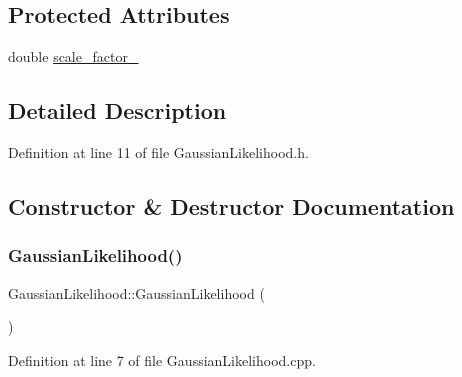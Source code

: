 \subsection*{Protected Attributes}
\begin{DoxyCompactItemize}
\item 
double \mbox{\hyperlink{classbfl_1_1GaussianLikelihood_ad08436040da927c3a2bdeac9eab8aedf}{scale\+\_\+factor\+\_\+}}
\end{DoxyCompactItemize}


\subsection{Detailed Description}


Definition at line 11 of file Gaussian\+Likelihood.\+h.



\subsection{Constructor \& Destructor Documentation}
\mbox{\label{classbfl_1_1GaussianLikelihood_a431a2163fac8be200939266f28b62e6f}} 
\subsubsection{\texorpdfstring{Gaussian\+Likelihood()}{GaussianLikelihood()}\hspace{0.1cm}{\footnotesize\ttfamily [1/2]}}
{\footnotesize\ttfamily Gaussian\+Likelihood\+::\+Gaussian\+Likelihood (\begin{DoxyParamCaption}{ }\end{DoxyParamCaption})\hspace{0.3cm}{\ttfamily [noexcept]}}



Definition at line 7 of file Gaussian\+Likelihood.\+cpp.

\mbox{\label{classbfl_1_1GaussianLikelihood_ade56bbd79aa46bb5d97abcae2590489d}} 

